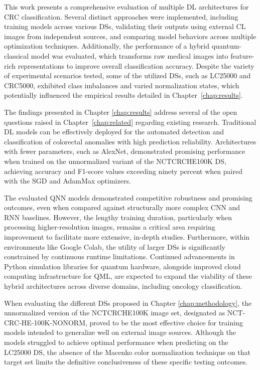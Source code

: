 \label{chap:conclusions}

This work presents a comprehensive evaluation of multiple \gls{DL} architectures for \gls{CRC} classification. Several distinct approaches were implemented, including training models across various \glspl{DS}, validating their outputs using external \gls{CL} images from independent sources, and comparing model behaviors across multiple optimization techniques. Additionally, the performance of a hybrid quantum-classical model was evaluated, which transforms raw medical images into feature-rich representations to improve overall classification accuracy. Despite the variety of experimental scenarios tested, some of the utilized \glspl{DS}, such as \gls{LC25000} and \gls{CRC5000}, exhibited class imbalances and varied normalization states, which potentially influenced the empirical results detailed in Chapter~\ref{chap:results}.

The findings presented in Chapter \ref{chap:results} address several of the open questions raised in Chapter~\ref{chap:related} regarding existing research. Traditional \gls{DL} models can be effectively deployed for the automated detection and classification of colorectal anomalies with high prediction reliability. Architectures with fewer parameters, such as AlexNet, demonstrated promising performance when trained on the unnormalized variant of the \gls{NCTCRCHE100K} \gls{DS}, achieving accuracy and F1-score values exceeding ninety percent when paired with the \gls{SGD} and AdamMax optimizers.

The evaluated \gls{QNN} models demonstrated competitive robustness and promising outcomes, even when compared against structurally more complex \gls{CNN} and \gls{RNN} baselines. However, the lengthy training duration, particularly when processing higher-resolution images, remains a critical area requiring improvement to facilitate more extensive, in-depth studies. Furthermore, within environments like Google Colab, the utility of larger \glspl{DS} is significantly constrained by continuous runtime limitations. Continued advancements in Python simulation libraries for quantum hardware, alongside improved cloud computing infrastructure for \gls{QML}, are expected to expand the viability of these hybrid architectures across diverse domains, including oncology classification.

When evaluating the different \glspl{DS} proposed in Chapter \ref{chap:methodology}, the unnormalized version of the \gls{NCTCRCHE100K} image set, designated as NCT-CRC-HE-100K-NONORM, proved to be the most effective choice for training models intended to generalize well on external image sources. Although the models struggled to achieve optimal performance when predicting on the \gls{LC25000} \gls{DS}, the absence of the Macenko color normalization technique \cite{5193250} on that target set limits the definitive conclusiveness of these specific testing outcomes.

